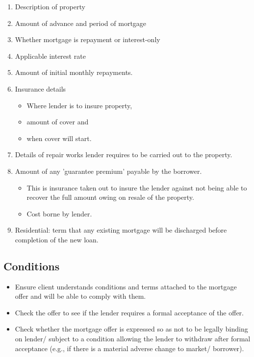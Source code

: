 \documentclass[
]{article}
\providecommand{\tightlist}{%
  \setlength{\itemsep}{0pt}\setlength{\parskip}{0pt}}
\begin{document}
\begin{enumerate}
\tightlist
\item
  Description of property
\item
  Amount of advance and period of mortgage
\item
  Whether mortgage is repayment or interest-only
\item
  Applicable interest rate
\item
  Amount of initial monthly repayments.
\item
  Insurance details

  \begin{itemize}
  \tightlist
  \item
    Where lender is to insure property,
  \item
    amount of cover and
  \item
    when cover will start.
  \end{itemize}
\item
  Details of repair works lender requires to be carried out to the
  property.
\item
  Amount of any 'guarantee premium' payable by the borrower.

  \begin{itemize}
  \tightlist
  \item
    This is insurance taken out to insure the lender against not being
    able to recover the full amount owing on resale of the property.
  \item
    Cost borne by lender.
  \end{itemize}
\item
  Residential: term that any existing mortgage will be discharged before
  completion of the new loan.
\end{enumerate}

\hypertarget{conditions}{%
\subsection{Conditions}\label{conditions}}

\begin{itemize}
\tightlist
\item
  Ensure client understands conditions and terms attached to the
  mortgage offer and will be able to comply with them.
\item
  Check the offer to see if the lender requires a formal acceptance of
  the offer.
\item
  Check whether the mortgage offer is expressed so as not to be legally
  binding on lender/ subject to a condition allowing the lender to
  withdraw after formal acceptance (e.g., if there is a material adverse
  change to market/ borrower).
\end{itemize}
\end{document}
